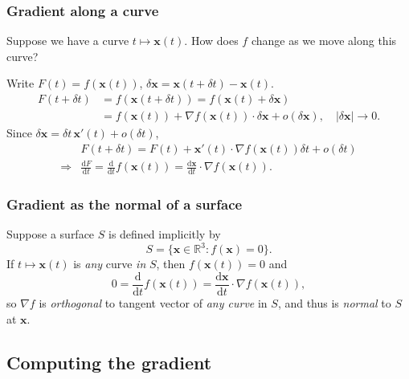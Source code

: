 \subsubsection*{Gradient along a curve}
Suppose we have a curve $ t \mapsto \mathbf{x}(t) $. How does $f$ change as we move along this curve?

Write $ F(t) = f(\mathbf{x}(t)) $, $ \delta\mathbf{x} = \mathbf{x}(t+\delta t)-\mathbf{x}(t) $.
\begin{align*}
    F(t+\delta t) &= f(\mathbf{x}(t+\delta t)) = f(\mathbf{x}(t)+\delta \mathbf{x})\\ 
    &= f(\mathbf{x}(t))+\nabla f(\mathbf{x}(t)) \cdot \delta\mathbf{x} +o(\delta \mathbf{x}),\quad |\delta\mathbf{x}| \to 0.
\end{align*}
Since $ \delta\mathbf{x} = \delta t\, \mathbf{x}'(t)+o(\delta t) $, 
\begin{align*}
    &F(t+\delta t)= F(t)+\mathbf{x}'(t) \cdot \nabla f(\mathbf{x}(t)) \delta t+o(\delta t)\\ 
    \Longrightarrow & \boxed{\frac{\mathrm{d}F}{\mathrm{d}t} = \frac{\mathrm{d}}{\mathrm{d}t}f(\mathbf{x}(t)) = \frac{\mathrm{d}\mathbf{x}}{\mathrm{d}t} \cdot \nabla f(\mathbf{x}(t))}.
\end{align*}

\subsubsection*{Gradient as the normal of a surface}
Suppose a surface $S$ is defined implicitly by 
\[
    S = \{\mathbf{x}\in \mathbb{R}^{3}: f(\mathbf{x})=0\}.
\]
If $ t \mapsto \mathbf{x}(t) $ is \textit{any} curve \textit{in} $S$, then $ f(\mathbf{x}(t))=0 $ and 
\[
    0 = \frac{\mathrm{d}}{\mathrm{d}t}f(\mathbf{x}(t)) =  \frac{\mathrm{d}\mathbf{x}}{\mathrm{d}t} \cdot \nabla f(\mathbf{x}(t)),
\]
so $ \nabla f $ is \textit{orthogonal} to tangent vector of \textit{any curve} in $S$, and thus is \textit{normal} to $S$ at $ \mathbf{x} $.

\subsection{Computing the gradient}
